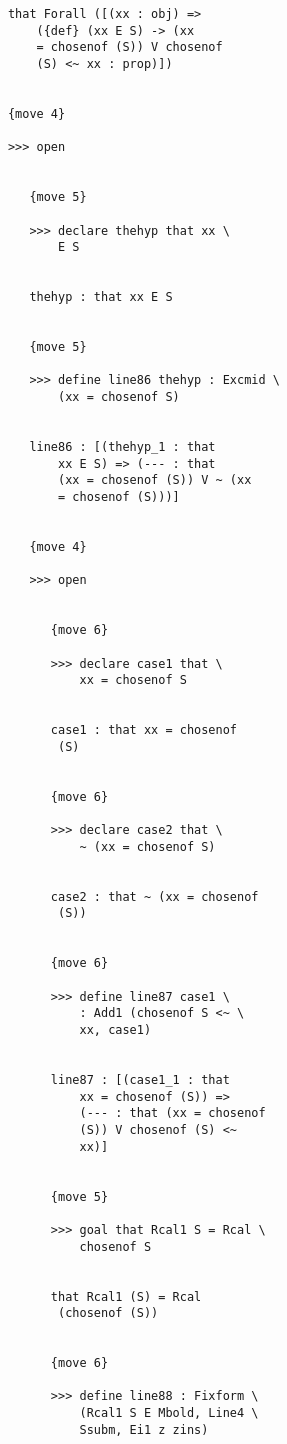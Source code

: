 \documentclass[12pt]{article}
\begin{document}
\begin{verbatim}
            that Forall ([(xx : obj) => 
                ({def} (xx E S) -> (xx 
                = chosenof (S)) V chosenof 
                (S) <~ xx : prop)])


            {move 4}

            >>> open


               {move 5}

               >>> declare thehyp that xx \
                   E S


               thehyp : that xx E S


               {move 5}

               >>> define line86 thehyp : Excmid \
                   (xx = chosenof S)


               line86 : [(thehyp_1 : that 
                   xx E S) => (--- : that 
                   (xx = chosenof (S)) V ~ (xx 
                   = chosenof (S)))]


               {move 4}

               >>> open


                  {move 6}

                  >>> declare case1 that \
                      xx = chosenof S


                  case1 : that xx = chosenof 
                   (S)


                  {move 6}

                  >>> declare case2 that \
                      ~ (xx = chosenof S)


                  case2 : that ~ (xx = chosenof 
                   (S))


                  {move 6}

                  >>> define line87 case1 \
                      : Add1 (chosenof S <~ \
                      xx, case1)


                  line87 : [(case1_1 : that 
                      xx = chosenof (S)) => 
                      (--- : that (xx = chosenof 
                      (S)) V chosenof (S) <~ 
                      xx)]


                  {move 5}

                  >>> goal that Rcal1 S = Rcal \
                      chosenof S


                  that Rcal1 (S) = Rcal 
                   (chosenof (S))


                  {move 6}

                  >>> define line88 : Fixform \
                      (Rcal1 S E Mbold, Line4 \
                      Ssubm, Ei1 z zins)



\end{verbatim}
\end{document}
